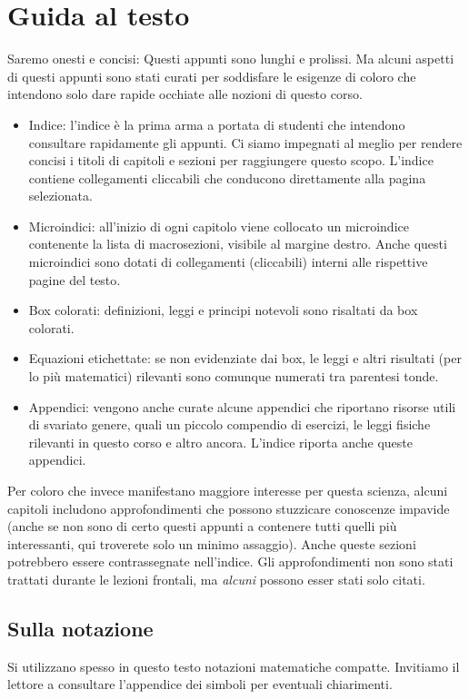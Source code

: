\chapter*{Guida al testo}
Saremo onesti e concisi: Questi appunti sono lunghi e prolissi.
Ma alcuni aspetti di questi appunti sono
stati curati per soddisfare le esigenze di coloro che intendono solo dare rapide
occhiate alle nozioni di questo corso.

\begin{itemize}
    \item Indice: l'indice è la prima arma a portata di studenti che intendono
    consultare rapidamente gli appunti. Ci siamo impegnati al meglio per rendere
    concisi i titoli di capitoli e sezioni per raggiungere questo scopo. L'indice
    contiene collegamenti cliccabili che conducono direttamente alla pagina selezionata.

    \item Microindici: all'inizio di ogni capitolo viene collocato un microindice
    contenente la lista di macrosezioni, visibile al margine destro. Anche questi microindici sono dotati di
    collegamenti (cliccabili) interni alle rispettive pagine del testo.

    \item Box colorati: definizioni, leggi e principi notevoli sono risaltati
    da box colorati.
    
    \item Equazioni etichettate: se non evidenziate dai box, le leggi e altri
    risultati (per lo più matematici) rilevanti sono comunque numerati tra
    parentesi tonde.

    \item Appendici: vengono anche curate alcune appendici che riportano risorse
    utili di svariato genere, quali un piccolo compendio di esercizi, le leggi
    fisiche rilevanti in questo corso e altro ancora. L'indice riporta anche
    queste appendici.
\end{itemize}

Per coloro che invece manifestano maggiore interesse per questa scienza, alcuni
capitoli includono approfondimenti che possono stuzzicare conoscenze impavide (anche
se non sono di certo questi appunti a contenere tutti quelli più interessanti,
qui troverete solo un minimo assaggio). Anche queste sezioni potrebbero essere
contrassegnate nell'indice.
Gli approfondimenti non sono stati trattati durante le lezioni frontali, ma
\textit{alcuni} possono esser stati solo citati.

\section*{Sulla notazione}
Si utilizzano spesso in questo testo notazioni matematiche compatte.
Invitiamo il lettore a consultare l'appendice dei simboli per eventuali
chiarimenti.

